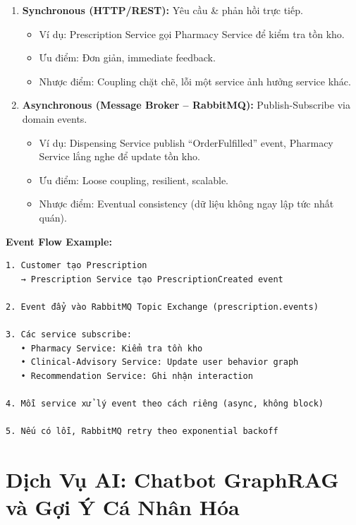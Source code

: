 \documentclass[12pt,a4paper]{article}
\begin{document}
\begin{enumerate}
    \item \textbf{Synchronous (HTTP/REST):} Yêu cầu & phản hồi trực tiếp.
    \begin{itemize}
        \item Ví dụ: Prescription Service gọi Pharmacy Service để kiểm tra tồn kho.
        \item Ưu điểm: Đơn giản, immediate feedback.
        \item Nhược điểm: Coupling chặt chẽ, lỗi một service ảnh hưởng service khác.
    \end{itemize}
    
    \item \textbf{Asynchronous (Message Broker – RabbitMQ):} Publish-Subscribe via domain events.
    \begin{itemize}
        \item Ví dụ: Dispensing Service publish ``OrderFulfilled'' event, Pharmacy Service lắng nghe để update tồn kho.
        \item Ưu điểm: Loose coupling, resilient, scalable.
        \item Nhược điểm: Eventual consistency (dữ liệu không ngay lập tức nhất quán).
    \end{itemize}
\end{enumerate}

\textbf{Event Flow Example:}

\begin{verbatim}
1. Customer tạo Prescription
   → Prescription Service tạo PrescriptionCreated event

2. Event đẩy vào RabbitMQ Topic Exchange (prescription.events)
   
3. Các service subscribe:
   • Pharmacy Service: Kiểm tra tồn kho
   • Clinical-Advisory Service: Update user behavior graph
   • Recommendation Service: Ghi nhận interaction

4. Mỗi service xử lý event theo cách riêng (async, không block)
   
5. Nếu có lỗi, RabbitMQ retry theo exponential backoff
\end{verbatim}


\newpage
\section{Dịch Vụ AI: Chatbot GraphRAG và Gợi Ý Cá Nhân Hóa}
\end{document}
